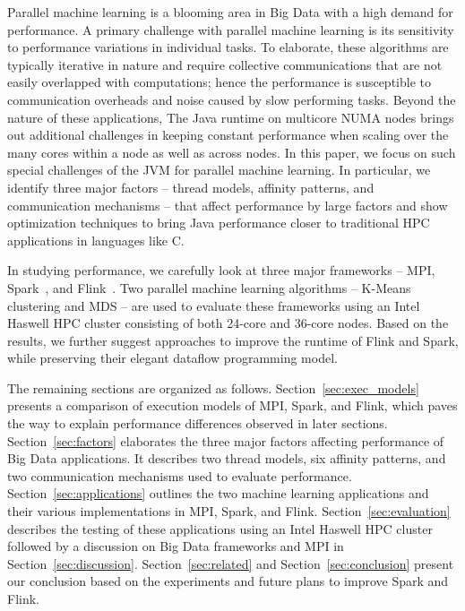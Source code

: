 \documentclass[10pt, conference, compsocconf]{IEEEtran}
\begin{document}
Parallel machine learning is a blooming area in Big Data with a high demand for performance. A primary challenge with parallel machine learning is its sensitivity to performance variations in individual tasks. To elaborate, these algorithms are typically iterative in nature and require collective communications that are not easily overlapped with computations; hence the performance is susceptible to communication overheads and noise caused by slow performing tasks. Beyond the nature of these applications, The Java runtime on multicore \ac{NUMA} nodes brings out additional challenges in keeping constant performance when scaling over the many cores within a node as well as across nodes. In this paper, we focus on such special challenges of the \ac{JVM} for parallel machine learning. In particular, we identify three major factors -- thread models, affinity patterns, and communication mechanisms -- that affect performance by large factors and show optimization techniques to bring Java performance closer to traditional \ac{HPC} applications in languages like C.

In studying performance, we carefully look at three major frameworks -- \ac{MPI}, Spark~\cite{Zaharia:2010:SCC:1863103.1863113}, and Flink~\cite{apache_flink, carbone2015lightweight}. Two parallel machine learning algorithms -- K-Means clustering and \ac{MDS} -- are used to evaluate these frameworks using an Intel Haswell \ac{HPC} cluster consisting of both 24-core and 36-core nodes. Based on the results, we further suggest approaches to improve the runtime of Flink and Spark, while preserving their elegant dataflow programming model.

The remaining sections are organized as follows. Section~\ref{sec:exec_models} presents a comparison of execution models of \ac{MPI}, Spark, and Flink, which paves the way to explain performance differences observed in later sections. Section~\ref{sec:factors} elaborates the three major factors affecting performance of Big Data applications. It describes two thread models, six affinity patterns, and two communication mechanisms used to evaluate performance. Section~\ref{sec:applications} outlines the two machine learning applications and their various implementations in \ac{MPI}, Spark, and Flink. Section~\ref{sec:evaluation} describes the testing of these applications using an Intel Haswell \ac{HPC} cluster followed by a discussion on Big Data frameworks and \ac{MPI} in Section~\ref{sec:discussion}. Section~\ref{sec:related} and Section~\ref{sec:conclusion} present our conclusion based on the experiments and future plans to improve Spark and Flink.
\end{document}

